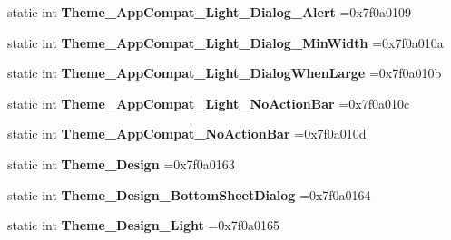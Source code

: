 \begin{DoxyCompactItemize}
static int {\bfseries Theme\+\_\+\+App\+Compat\+\_\+\+Light\+\_\+\+Dialog\+\_\+\+Alert} =0x7f0a0109
\item 
\mbox{\label{classandroid_1_1support_1_1v7_1_1appcompat_1_1R_1_1style_a01131ce7d958d1840743e8b670fc853c}} 
static int {\bfseries Theme\+\_\+\+App\+Compat\+\_\+\+Light\+\_\+\+Dialog\+\_\+\+Min\+Width} =0x7f0a010a
\item 
\mbox{\label{classandroid_1_1support_1_1v7_1_1appcompat_1_1R_1_1style_a04ab0cf2a774acffeae3e75a43418b39}} 
static int {\bfseries Theme\+\_\+\+App\+Compat\+\_\+\+Light\+\_\+\+Dialog\+When\+Large} =0x7f0a010b
\item 
\mbox{\label{classandroid_1_1support_1_1v7_1_1appcompat_1_1R_1_1style_a55de9a2d839056356ec0f899570b69ed}} 
static int {\bfseries Theme\+\_\+\+App\+Compat\+\_\+\+Light\+\_\+\+No\+Action\+Bar} =0x7f0a010c
\item 
\mbox{\label{classandroid_1_1support_1_1v7_1_1appcompat_1_1R_1_1style_a341e67af7885d98de3b5362a4f68c97a}} 
static int {\bfseries Theme\+\_\+\+App\+Compat\+\_\+\+No\+Action\+Bar} =0x7f0a010d
\item 
\mbox{\label{classandroid_1_1support_1_1v7_1_1appcompat_1_1R_1_1style_a7e28d0b72e1a3f6ea7e095858fdd7d1e}} 
static int {\bfseries Theme\+\_\+\+Design} =0x7f0a0163
\item 
\mbox{\label{classandroid_1_1support_1_1v7_1_1appcompat_1_1R_1_1style_a0f7dea9b9ee6664b43c4264828582e2a}} 
static int {\bfseries Theme\+\_\+\+Design\+\_\+\+Bottom\+Sheet\+Dialog} =0x7f0a0164
\item 
\mbox{\label{classandroid_1_1support_1_1v7_1_1appcompat_1_1R_1_1style_a1c1b6df5a3d07004eca6f79433716cbb}} 
static int {\bfseries Theme\+\_\+\+Design\+\_\+\+Light} =0x7f0a0165
\item 
\mbox{\label{classandroid_1_1support_1_1v7_1_1appcompat_1_1R_1_1style_aa42c3061b63cff58f470a71f765a6401}} 

\end{DoxyCompactItemize}

